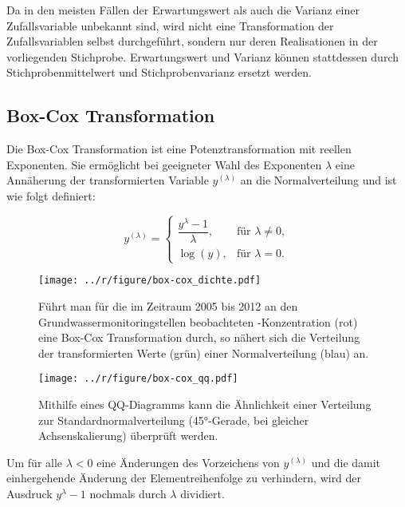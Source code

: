 Da in den meisten Fällen der Erwartungswert als auch die Varianz einer Zufallsvariable unbekannt sind, wird nicht eine Transformation der Zufallsvariablen selbst durchgeführt, sondern nur deren Realisationen in der vorliegenden Stichprobe. Erwartungswert und Varianz können stattdessen durch Stichprobenmittelwert und Stichprobenvarianz ersetzt werden.

\subsection{Box-Cox Transformation}
\label{ch:box-cox}
Die Box-Cox Transformation ist eine Potenztransformation mit reellen Exponenten. Sie ermöglicht bei geeigneter Wahl des Exponenten $\lambda$ eine Annäherung der transformierten Variable  $y^{(\lambda)}$ an die Normalverteilung  und ist wie folgt definiert: 

\begin{equation*}
y^{(\lambda)} =
\begin{cases}
\dfrac{y^\lambda-1}{\lambda} , &\text{für } \lambda \neq 0, \\[8pt] 
\log{(y)} , &\text{für } \lambda = 0.
\end{cases}
\end{equation*}

\begin{figure}
 \texttt{[image: ../r/figure/box-cox\_dichte.pdf]}
 \caption[Veränderung der Dichtefunktion durch eine Box-Cox Transformation]{Führt man für die im Zeitraum 2005 bis 2012 an den Grundwassermonitoringstellen beobachteten -Konzentration (rot) eine Box-Cox  Transformation durch, so nähert sich die Verteilung der transformierten Werte (grün) einer Normalverteilung (blau) an.}
\end{figure}

\begin{figure}
 \texttt{[image: ../r/figure/box-cox\_qq.pdf]}
 \caption[QQ--Plot. Annäherung an die Normalverteilung durch Box-Cox Transformation]{Mithilfe eines QQ-Diagramms kann die Ähnlichkeit einer Verteilung zur Standardnormalverteilung (\ang{45}-Gerade, bei gleicher Achsenskalierung) überprüft werden.}
\end{figure}

Um für alle $\lambda < 0$ eine Änderungen des Vorzeichens von $y^{(\lambda)}$ und die damit einhergehende  Änderung der Elementreihenfolge zu verhindern, wird der Ausdruck $y^\lambda-1$ nochmals durch $\lambda$ dividiert. 


